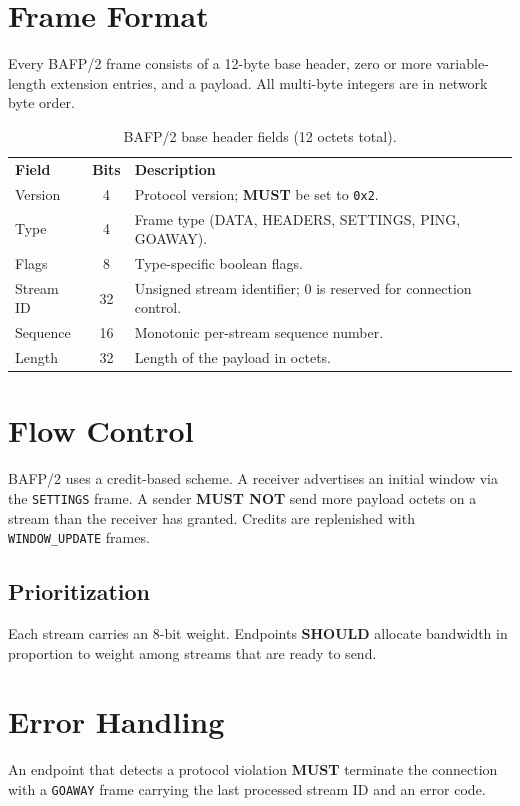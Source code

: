 \documentclass[11pt]{article}
\newcommand{\bcp}[1]{\textbf{\textcolor{accent}{#1}}}   %
\begin{document}
\section{Frame Format}
Every BAFP/2 frame consists of a 12-byte base header, zero or more variable-length
extension entries, and a payload. All multi-byte integers are in network byte order.

\begin{table}[ht]\centering
{}
\begin{tabularx}{\linewidth}{@{}l c X@{}}
\rowcolor{ink}
{\color{white}\textbf{Field}} & {\color{white}\textbf{Bits}} & {\color{white}\textbf{Description}}\\
Version   & 4  & Protocol version; \bcp{MUST} be set to \texttt{0x2}.\\
Type      & 4  & Frame type (DATA, HEADERS, SETTINGS, PING, GOAWAY).\\
Flags     & 8  & Type-specific boolean flags.\\
Stream ID & 32 & Unsigned stream identifier; 0 is reserved for connection control.\\
Sequence  & 16 & Monotonic per-stream sequence number.\\
Length    & 32 & Length of the payload in octets.\\
\end{tabularx}
\caption{BAFP/2 base header fields (12 octets total).}
\end{table}

\section{Flow Control}
BAFP/2 uses a credit-based scheme. A receiver advertises an initial window via the
\texttt{SETTINGS} frame. A sender \bcp{MUST NOT} send more payload octets on a stream than
the receiver has granted. Credits are replenished with \texttt{WINDOW\_UPDATE} frames.

\subsection{Prioritization}
Each stream carries an 8-bit weight. Endpoints \bcp{SHOULD} allocate bandwidth in
proportion to weight among streams that are ready to send.

\section{Error Handling}
An endpoint that detects a protocol violation \bcp{MUST} terminate the connection with a
\texttt{GOAWAY} frame carrying the last processed stream ID and an error code.
\end{document}
